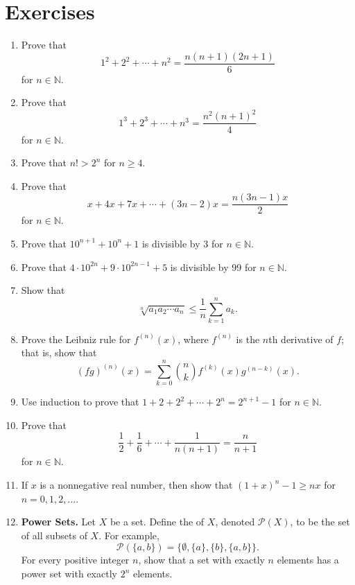 \section*{Exercises}
\exrule

{\small
 
\begin{enumerate}
 
\item
Prove that
\[
1^2 + 2^2 + \cdots + n^2 = \frac{n(n + 1)(2n + 1)}{6}
\]
for $n \in {\mathbb N}$.

\item
Prove that
\[
1^3 + 2^3 + \cdots + n^3 = \frac{n^2(n + 1)^2}{4}
\]
for $n \in {\mathbb N}$.

\item
Prove that $n! > 2^n$ for $n \geq 4$.

\item
Prove that
\[
x + 4x + 7x + \cdots + (3n-2)x = \frac{n(3n - 1)x}{2}
\]
for $n \in {\mathbb N}$.

\item
Prove that $10^{n + 1} + 10^n + 1$ is divisible by 3 for $n \in {\mathbb N}$.

\item
Prove that $4 \cdot 10^{2n} + 9 \cdot 10^{2n - 1} + 5$ is divisible by 99 for $n \in {\mathbb N}$.

\item
Show that
\[
\sqrt[n]{a_1 a_2 \cdots a_n} \leq \frac{1}{n} \sum_{k = 1}^{n} a_k.
\]

\item
Prove the Leibniz rule for $f^{(n)} (x)$, where $f^{(n)}$ is the $n$th derivative of $f$; that is, show that 
\[
(fg)^{(n)} (x) = \sum_{k=0}^{n} \binom{n}{k} f^{(k)}(x) g^{(n-k)} (x).
\]

\item
Use induction to prove that $1 + 2 + 2^2 + \cdots + 2^n = 2^{n + 1} - 1$ for $n \in {\mathbb N}$. 

\item 
Prove that
\[
\frac{1}{2}+ \frac{1}{6} + \cdots + \frac{1}{n(n + 1)} = \frac{n}{n + 1} 
\]
for $n \in {\mathbb N}$.

\item 
If $x$ is a nonnegative real number, then show that $(1 + x)^n - 1 \geq nx$ for $n = 0, 1, 2, \ldots$. 
 
\item
\textbf{Power Sets.} 
Let $X$ be a set.  Define the  of $X$, denoted ${\mathcal P}(X)$\label{powerset}, to be the set of all subsets  of $X$.  For example,  
\[
{\mathcal P}( \{a, b\} ) = \{ \emptyset, \{a\}, \{b\}, \{a, b\} \}.
\]
For every positive integer $n$, show that a set with exactly $n$ elements has a power set with exactly $2^n$ elements.


\end{enumerate}}
